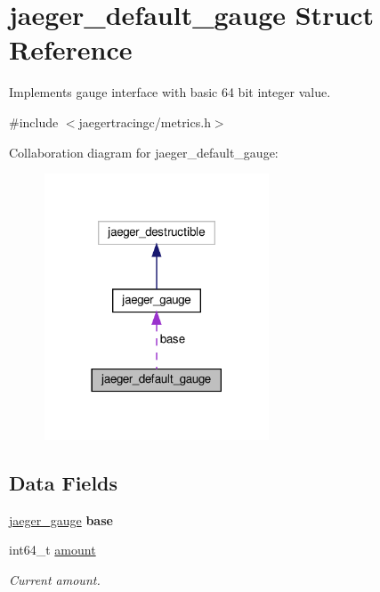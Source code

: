 \hypertarget{structjaeger__default__gauge}{}\section{jaeger\+\_\+default\+\_\+gauge Struct Reference}
\label{structjaeger__default__gauge}


Implements gauge interface with basic 64 bit integer value.  




{\ttfamily \#include $<$jaegertracingc/metrics.\+h$>$}



Collaboration diagram for jaeger\+\_\+default\+\_\+gauge\+:\nopagebreak
\begin{figure}[H]
\begin{center}
\leavevmode
\includegraphics[width=189pt]{structjaeger__default__gauge__coll__graph}
\end{center}
\end{figure}
\subsection*{Data Fields}
\begin{DoxyCompactItemize}
\item 
\mbox{\label{structjaeger__default__gauge_acef3ca538f119dac6856a6cfe65ca814}} 
\mbox{\hyperlink{structjaeger__gauge}{jaeger\+\_\+gauge}} {\bfseries base}
\item 
int64\+\_\+t \mbox{\hyperlink{structjaeger__default__gauge_a5b5def7f03d492758487c564d9e0e6e3}{amount}}
\begin{DoxyCompactList}\small\item\em Current amount. \end{DoxyCompactList}\end{DoxyCompactItemize}


